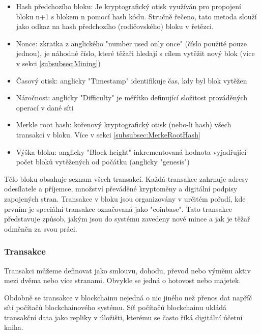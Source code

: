 \begin{itemize}
	\item Hash předchozího bloku: Je kryptografický otisk využíván pro propojení bloku n+1 s blokem n pomocí hash kódu. Stručně řečeno, tato metoda slouží jako odkaz na hash předchozího (rodičovského) bloku v řetězci.
	\item Nonce: zkratka z anglického "number used only once" (číslo použité pouze jednou), je náhodné číslo, které těžaři hledají s cílem vytěžit nový blok (více v sekci \ref{subsubsec:Mining})
	\item Časový otisk: anglicky "Timestamp" identifikuje čas, kdy byl blok vytěžen
	\item Náročnost: anglicky "Difficulty" je měřítko definující složitost prováděných operací v dané síti
	\item Merkle root hash: kořenový kryptografický otisk (nebo-li hash) všech transakcí v bloku. Více v sekci \ref{subsubsec:MerkeRootHash}
	\item Výška bloku: anglicky "Block height" inkrementovaná hodnota vyjadřující počet bloků vytěžených od počátku (anglicky "genesis")
\end{itemize}




Tělo bloku obsahuje seznam všech transakcí. Každá transakce zahrnuje adresy odesílatele a příjemce, množství převáděné kryptoměny a digitální podpisy zapojených stran. Transakce v bloku jsou organizovány v určitém pořadí, kde prvním je speciální transakce označovaná jako "coinbase". Tato transakce představuje způsob, jakým jsou do systému zavedeny nové mince a jak je těžař odměněn za svou práci. \cite{struktura-bloku} \cite{telo-bloku}




\subsubsection{Transakce}\label{subsubsec:Transactions}

Transakci můžeme definovat jako smlouvu, dohodu, převod nebo výměnu aktiv mezi dvěma nebo více stranami. Obvykle se jedná o hotovost nebo majetek.

Obdobně se transakce v blockchainu nejedná o nic jiného než přenos dat napříč sítí počítačů blockchainového systému. Síť počítačů blockchainu ukládá transakční data jako repliky v úložišti, kterému se často říká digitální účetní kniha.

